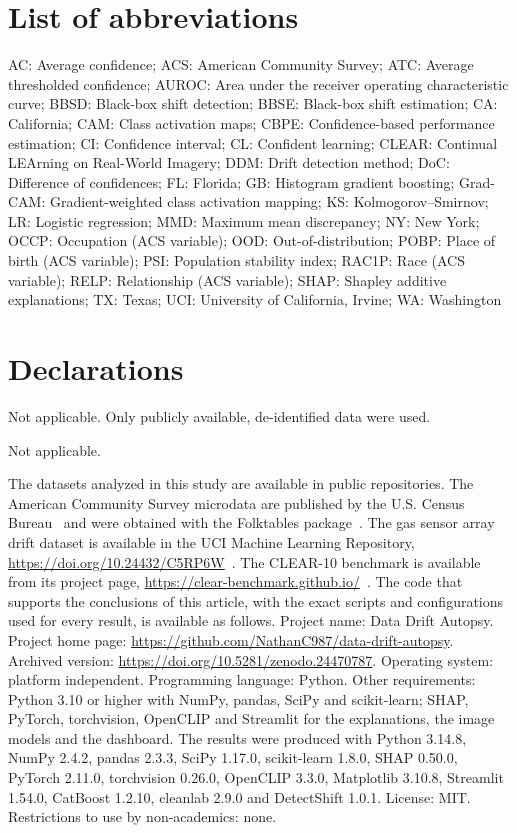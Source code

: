 \documentclass[pdflatex,referee,lineno,sn-basic]{sn-jnl}
\begin{document}
\section*{List of abbreviations}

AC: Average confidence; ACS: American Community Survey; ATC: Average thresholded confidence; AUROC: Area under the receiver operating characteristic curve; BBSD: Black-box shift detection; BBSE: Black-box shift estimation; CA: California; CAM: Class activation maps; CBPE: Confidence-based performance estimation; CI: Confidence interval; CL: Confident learning; CLEAR: Continual LEArning on Real-World Imagery; DDM: Drift detection method; DoC: Difference of confidences; FL: Florida; GB: Histogram gradient boosting; Grad-CAM: Gradient-weighted class activation mapping; KS: Kolmogorov--Smirnov; LR: Logistic regression; MMD: Maximum mean discrepancy; NY: New York; OCCP: Occupation (ACS variable); OOD: Out-of-distribution; POBP: Place of birth (ACS variable); PSI: Population stability index; RAC1P: Race (ACS variable); RELP: Relationship (ACS variable); SHAP: Shapley additive explanations; TX: Texas; UCI: University of California, Irvine; WA: Washington

\section*{Declarations}


Not applicable. Only publicly available, de-identified data were used.


Not applicable.


The datasets analyzed in this study are available in public repositories. The American Community Survey microdata are published by the U.S. Census Bureau~\citep{census2026pums} and were obtained with the Folktables package~\citep{ding2021retiring}. The gas sensor array drift dataset is available in the UCI Machine Learning Repository, \url{https://doi.org/10.24432/C5RP6W}~\citep{vergara2012gasdata}. The CLEAR-10 benchmark is available from its project page, \url{https://clear-benchmark.github.io/}~\citep{lin2021clear}. The code that supports the conclusions of this article, with the exact scripts and configurations used for every result, is available as follows. Project name: Data Drift Autopsy. Project home page: \url{https://github.com/NathanC987/data-drift-autopsy}. Archived version: \url{https://doi.org/10.5281/zenodo.24470787}. Operating system: platform independent. Programming language: Python. Other requirements: Python 3.10 or higher with NumPy, pandas, SciPy and scikit-learn; SHAP, PyTorch, torchvision, OpenCLIP and Streamlit for the explanations, the image models and the dashboard. The results were produced with Python 3.14.8, NumPy 2.4.2, pandas 2.3.3, SciPy 1.17.0, scikit-learn 1.8.0, SHAP 0.50.0, PyTorch 2.11.0, torchvision 0.26.0, OpenCLIP 3.3.0, Matplotlib 3.10.8, Streamlit 1.54.0, CatBoost 1.2.10, cleanlab 2.9.0 and DetectShift 1.0.1. License: MIT. Restrictions to use by non-academics: none.
\end{document}
